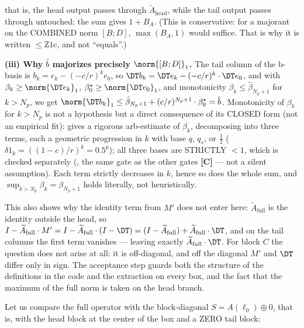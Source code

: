 that is, the head output passes through $\widetilde{A}_{\mathrm{head}}$,
while the tail output passes through untouched; the sum gives
$1 + B_{A}$. (This is conservative: for a majorant on the COMBINED norm
$[B; D]$, $\max(B_{A}, 1)$ would suffice. That is why it is written
$\le \mathrm{Z1c}$, and not ``equals''.)

\textbf{(iii) Why $\hat{b}$ majorizes precisely $\norm{[B; D]}_{1}$.} The
tail column of the b-basis is $b_{k} = e_{k} - (-c/r)^{k} e_{0}$, so
$\DT b_{k} = \DT e_{k} - (-c/r)^{k}\cdot \DT e_{0}$, and with
$\beta_{k} \ge \norm{\DT e_{k}}_{1}$,
$\beta_{0}^{\star} \ge \norm{\DT e_{0}}_{1}$, and monotonicity
$\beta_{k} \le \hat{\beta}_{N_{p}+1}$ for $k > N_{p}$, we get
$\norm{\DT b_{k}}_{1} \le \hat{\beta}_{N_{p}+1} + (c/r)^{N_{p}+1}\cdot
\beta_{0}^{\star} = \hat{b}$.
Monotonicity of $\beta_{k}$ for $k > N_{p}$ is not a hypothesis but a
direct consequence of its CLOSED form (not an empirical fit):
 gives a rigorous arb-estimate of
$\beta_{k}$, decomposing into three terms, each a geometric progression in
$k$ with base $q$, $q_s$, or $\frac{1}{2}$
($\delta1_{k} = ((1-c)/r)^{k} = 0.5^{k}$); all three bases are STRICTLY
$< 1$, which is checked separately (, the same
 gate as the other gates \textbf{[C]} --- not a silent
assumption). Each term strictly decreases in $k$, hence so does the whole
sum, and $\sup_{k > N_{p}}\beta_{k} = \beta_{N_{p}+1}$ holds literally,
not heuristically.

This also shows why the identity term from $M'$ does not enter here:
$\widetilde{A}_{\mathrm{full}}$ is the identity outside the head, so
$I - \widetilde{A}_{\mathrm{full}}\cdot M' = I -
\widetilde{A}_{\mathrm{full}}\cdot (I - \DT) = (I -
\widetilde{A}_{\mathrm{full}}) + \widetilde{A}_{\mathrm{full}}\cdot \DT$,
and on the tail columns the first term vanishes --- leaving exactly
$\widetilde{A}_{\mathrm{full}}\cdot \DT$. For block $C$ the question does
not arise at all: it is off-diagonal, and off the diagonal $M'$ and $\DT$
differ only in sign. The acceptance step
 guards both the structure of the
definitions in the code and the extraction on every box, and the fact that
the maximum of the full norm is taken on the head branch.

Let us compare the full operator with the block-diagonal
$S = A(\ell_{0}) \oplus 0$, that is, with the head block at the center of
the box and a ZERO tail block:

